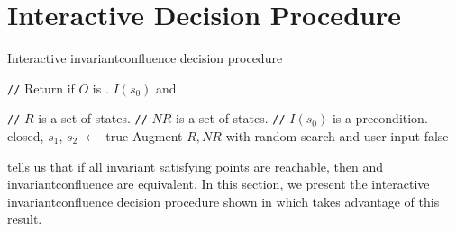 \section{Interactive Decision Procedure}
\newcommand{\Helper}{\textsf{Helper}}
\newcommand{\IsIclosed}{\textsf{IsIclosed}}
\newcommand{\IsInvConfluent}{\textsf{IsInvConfluent}}

\newcommand{\algocomment}[1]{\State \textcolor{flatdenim}{\texttt{//} #1}}
\begin{algorithm}[t]
  \caption{Interactive invariantconfluence{} decision procedure}%
  \begin{algorithmic}
    \algocomment{Return if $O$ is \sTIconfluent{}.}
      \State
        \Return $I(s_0)$ and
    \EndFunction

    \State

    \algocomment{$R$ is a set of \sTIreachable{} states.}
    \algocomment{$NR$ is a set of \sTIunreachable{} states.}
    \algocomment{$I(s_0)$ is a precondition.}
      \State closed, $s_1$, $s_2$ $\gets$ 
        \Return true
      \EndIf
      \State Augment $R, NR$ with random search and user input
        \Return false
      \EndIf
      \State \Return {}
    \EndFunction
  \end{algorithmic}
\end{algorithm}

 tells us that if all invariant
satisfying points are reachable, then \invariantclosure{} and
invariantconfluence{} are equivalent. In this section, we present the
interactive invariantconfluence{} decision procedure shown in
 which takes advantage of this result.

